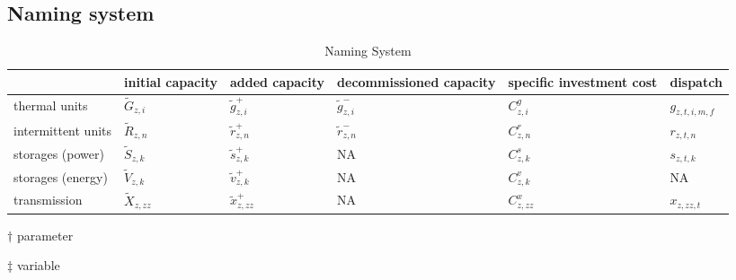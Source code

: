 \documentclass[review, 3p, times, 12pt, authoryear]{elsarticle}
\begin{document}
    \subsection{Naming system}
    \begin{table*}[h!]
        \centering
        \begin{threeparttable}
            \caption{Naming System}
            \begin{tabulary}{\textwidth}{LLLLLL}
                \toprule
                & initial capacity\tnote{$\dagger$}    & added capacity\tnote{$\ddagger$}  & decommissioned capacity\tnote{$\ddagger$} & specific investment cost\tnote{$\dagger$} & dispatch\tnote{$\ddagger$}   \\
                \midrule
                thermal units &$\widetilde{G}_{z,i}$                &$\widetilde{g}^{+}_{z,i}$         &$\widetilde{g}^{-}_{z,i}$                &$C^{g}_{z,i}$                            &$g_{z,t,i,m,f}$              \\
                intermittent units &$\widetilde{R}_{z,n}$                &$\widetilde{r}^{+}_{z,n}$        &$\widetilde{r}^{-}_{z,n}$                &$C^{r}_{z,n}$                            &$r_{z,t,n}$                  \\
                storages (power)    &$\widetilde{S}_{z,k}$                &$\widetilde{s}^{+}_{z,k}$        & NA &$C^{s}_{z,k}$                             &$s_{z,t,k}$\\
                storages (energy)   &$\widetilde{V}_{z,k}$                &$\widetilde{v}^{+}_{z,k}$        & NA &$C^{v}_{z,k}$                            & NA                            \\
                transmission &$\widetilde{X}_{z,zz}$               &$\widetilde{x}^{+}_{z,zz}$       & NA &$C^{x}_{z,zz}$                           &$x_{z,zz,t}$\\
                \bottomrule
            \end{tabulary}

            \begin{tablenotes}
                \item[$\dagger$] parameter
                \item[$\ddagger$] variable
            \end{tablenotes}
        \end{threeparttable}
    \end{table*}

    \newpage
\end{document}
